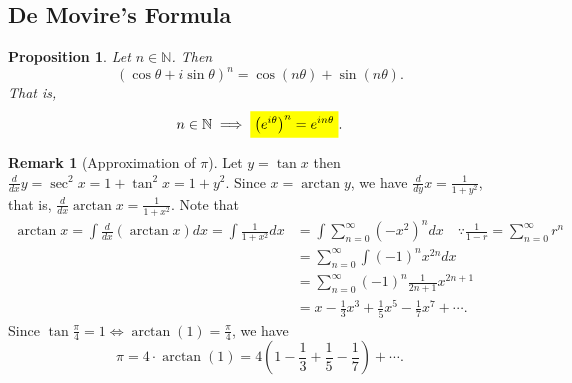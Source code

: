 \documentclass[12pt,openany]{book}
\newcommand{\mathcolorbox}[2]{\colorbox{#1}{$\displaystyle #2$}}
\newtheorem{proposition}[theorem]{Proposition}
\theoremstyle{definition}
\newtheorem{remark}{Remark}[section]
\newcommand{\N}{\mathbb{N}}
\newcommand{\of}[1]{\left( #1 \right)}
\begin{document}
	\subsection{De Movire's Formula}
	\begin{tcolorbox}[colback=white,colframe=procolor, title={\color{white}\bf De Moivre's Formula}]
		\begin{proposition}
			Let $n\in\N$. Then \[
			\of{\cos\theta+i\sin\theta}^n=\cos(n\theta)+\sin(n\theta).
			\]  That is, \[
			n\in\N\implies \mathcolorbox{-blue}{\of{e^{i\theta}}^n=e^{in\theta}}.
			\]
		\end{proposition}
	\end{tcolorbox}
	\newpage
	\begin{remark}[Approximation of $\pi$]
		Let $y=\tan x$ then $\frac{d}{dx}y=\sec^2x=1+\tan^2x=1+y^2$. Since $x=\arctan y$, we have $\frac{d}{dy}x=\frac{1}{1+y^2}$, that is, $\frac{d}{dx}\arctan x=\frac{1}{1+x^2}$. Note that \begin{align*}
			\arctan x =\int\frac{d}{dx}\of{\arctan x}dx=\int\frac{1}{1+x^2}dx
			&=\int\sum_{n=0}^\infty\of{-x^2}^ndx\quad\because\frac{1}{1-r}=\sum_{n=0}^\infty r^n\\
			&=\sum_{n=0}^\infty\int(-1)^nx^{2n}dx\\
			&=\sum_{n=0}^\infty(-1)^n\frac{1}{2n+1}x^{2n+1}\\
			&=x-\frac{1}{3}x^3+\frac{1}{5}x^5-\frac{1}{7}x^7+\cdots.
		\end{align*} Since $\tan\frac{\pi}{4}=1\Leftrightarrow\arctan(1)=\frac{\pi}{4}$, we have \[
		\pi=4\cdot\arctan(1)=4\of{1-\frac{1}{3}+\frac{1}{5}-\frac{1}{7}}+\cdots.
		\]
	\end{remark}
	\vspace{8pt}
\end{document}
